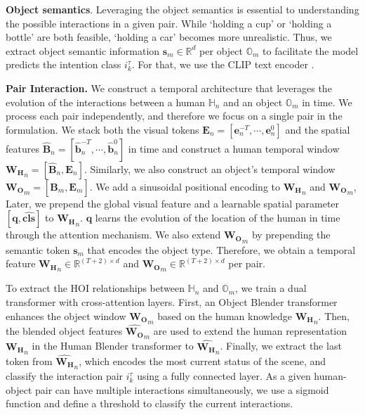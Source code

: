 \documentclass{article}
\begin{document}
\textbf{Object semantics}. Leveraging the object semantics is essential to understanding the possible interactions in a given pair. While `holding a cup' or `holding a bottle' are both feasible, `holding a car' becomes more unrealistic. Thus, we extract object semantic information $\mathbf{s}_m \in \mathbb{R}^{d}$  per object $\mathbb{O}_m$ to facilitate the model predicts the intention class $i_k^{\tau}$. For that, we use the CLIP text encoder \citep{clip}.


\textbf{Pair Interaction. }
We construct a temporal architecture that leverages the evolution of the interactions between a human $\mathbb{H}_n$ and an object $\mathbb{O}_m$ in time. We process each pair independently, and therefore we focus on a single pair in the formulation. We stack both the visual tokens $\mathbf{E}_n=[\mathbf{e}_n^{-T}, \cdots, \mathbf{e}_n^{0}]$ and the spatial features $\hat{\mathbf{B}}_n=[\hat{\mathbf{b}}_n^{-T}, \cdots, \hat{\mathbf{b}}_n^{0}]$ in time and construct a human temporal window $\mathbf{W_H}_{n}=[\hat{\mathbf{B}}_n, \mathbf{E}_n]$. Similarly, we also construct an object's temporal window $\mathbf{W_O}_{m}=[\hat{\mathbf{B}}_m, \mathbf{E}_m]$. We add a sinusoidal positional encoding to $\mathbf{W_H}_{n}$  and $\mathbf{W_O}_{m}$, Later, we prepend the global visual feature and a learnable spatial parameter $[\mathbf{q},\mathbf{\widehat{cls}}]$ to $\mathbf{W_H}_{n}$. $\mathbf{q}$ learns the evolution of the location of the human in time through the attention mechanism. We also extend  $\mathbf{W_O}_{m}$ by prepending the semantic token $\mathbf{s}_m$ that encodes the object type.  Therefore, we obtain a temporal feature $\mathbf{W_H}_{n}  \in \mathbb{R}^{(T+2) \times d}$ and $\mathbf{W_O}_{m} \in \mathbb{R}^{(T+2) \times d}$ per pair. 

To extract the HOI relationships between $\mathbb{H}_n$ and $\mathbb{O}_m$, we train a dual transformer with cross-attention layers. First, an Object Blender transformer enhances the object window $\mathbf{W_O}_{m}$ based on the human knowledge $\mathbf{W_H}_{n}$. Then, the blended object features $\widehat{\mathbf{W_O}}_{m}$ are used to extend the human representation $\mathbf{W_H}_{n}$ in the Human Blender transformer to $\widehat{\mathbf{W_H}}_{n}$. Finally, we extract the last token from $\widehat{\mathbf{W_H}}_{n}$, which encodes the most current status of the scene, and classify the interaction pair $i_k^{\tau}$ using a fully connected layer. As a given human-object pair can have multiple interactions simultaneously, we use a sigmoid function and define a threshold to classify the current interactions.
\end{document}
